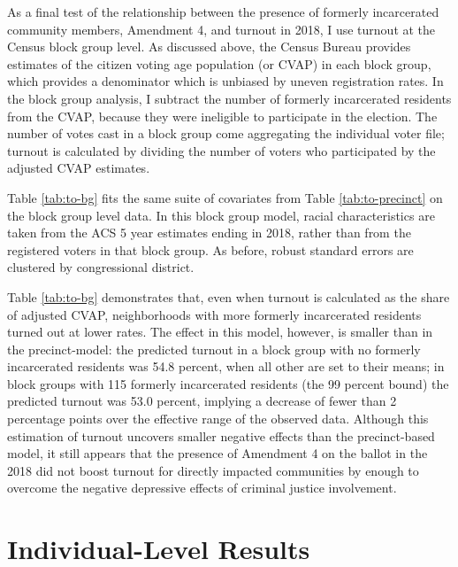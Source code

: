 \documentclass[
  12pt,
]{article}
\begin{document}
As a final test of the relationship between the presence of formerly incarcerated community members, Amendment 4, and turnout in 2018, I use turnout at the Census block group level. As discussed above, the Census Bureau provides estimates of the citizen voting age population (or CVAP) in each block group, which provides a denominator which is unbiased by uneven registration rates. In the block group analysis, I subtract the number of formerly incarcerated residents from the CVAP, because they were ineligible to participate in the election. The number of votes cast in a block group come aggregating the individual voter file; turnout is calculated by dividing the number of voters who participated by the adjusted CVAP estimates.

Table \ref{tab:to-bg} fits the same suite of covariates from Table \ref{tab:to-precinct} on the block group level data. In this block group model, racial characteristics are taken from the ACS 5 year estimates ending in 2018, rather than from the registered voters in that block group. As before, robust standard errors are clustered by congressional district.

\begin{singlespace}


\end{singlespace}

Table \ref{tab:to-bg} demonstrates that, even when turnout is calculated as the share of adjusted CVAP, neighborhoods with more formerly incarcerated residents turned out at lower rates. The effect in this model, however, is smaller than in the precinct-model: the predicted turnout in a block group with no formerly incarcerated residents was 54.8 percent, when all other are set to their means; in block groups with 115 formerly incarcerated residents (the 99 percent bound) the predicted turnout was 53.0 percent, implying a decrease of fewer than 2 percentage points over the effective range of the observed data. Although this estimation of turnout uncovers smaller negative effects than the precinct-based model, it still appears that the presence of Amendment 4 on the ballot in the 2018 did not boost turnout for directly impacted communities by enough to overcome the negative depressive effects of criminal justice involvement.

\hypertarget{individual-level-results}{%
\section*{Individual-Level Results}\label{individual-level-results}}
\end{document}

